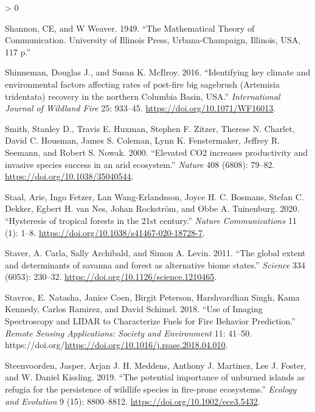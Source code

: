 \documentclass[
  12pt,
]{article}
\newlength{\cslhangindent}
\newenvironment{CSLReferences}[2] %
 {%
  \setlength{\parindent}{0pt}
  \ifodd #1 \everypar{\setlength{\hangindent}{\cslhangindent}}\ignorespaces\fi
  \ifnum #2 > 0
  \setlength{\parskip}{#2\baselineskip}
  \fi
 }%
 {}
\begin{document}
\begin{CSLReferences}{1}{0}
\leavevmode\hypertarget{ref-Shannon1949}{}%
Shannon, CE, and W Weaver. 1949. {``The Mathematical Theory of
Communication. University of Illinois Press, Urbana-Champaign, Illinois,
USA, 117 p.''}

\leavevmode\hypertarget{ref-Shinneman2016}{}%
Shinneman, Douglas J., and Susan K. McIlroy. 2016. {``{Identifying key
climate and environmental factors affecting rates of post-fire big
sagebrush (Artemisia tridentata) recovery in the northern Columbia
Basin, USA}.''} \emph{International Journal of Wildland Fire} 25:
933--45. \url{https://doi.org/10.1071/WF16013}.

\leavevmode\hypertarget{ref-Smith2000}{}%
Smith, Stanley D., Travis E. Huxman, Stephen F. Zitzer, Therese N.
Charlet, David C. Housman, James S. Coleman, Lynn K. Fenstermaker,
Jeffrey R. Seemann, and Robert S. Nowak. 2000. {``{Elevated CO2
increases productivity and invasive species success in an arid
ecosystem}.''} \emph{Nature} 408 (6808): 79--82.
\url{https://doi.org/10.1038/35040544}.

\leavevmode\hypertarget{ref-Staal2020}{}%
Staal, Arie, Ingo Fetzer, Lan Wang-Erlandsson, Joyce H. C. Bosmans,
Stefan C. Dekker, Egbert H. van Nes, Johan Rockström, and Obbe A.
Tuinenburg. 2020. {``{Hysteresis of tropical forests in the 21st
century}.''} \emph{Nature Communications} 11 (1): 1--8.
\url{https://doi.org/10.1038/s41467-020-18728-7}.

\leavevmode\hypertarget{ref-Staver2011}{}%
Staver, A. Carla, Sally Archibald, and Simon A. Levin. 2011. {``{The
global extent and determinants of savanna and forest as alternative
biome states}.''} \emph{Science} 334 (6053): 230--32.
\url{https://doi.org/10.1126/science.1210465}.

\leavevmode\hypertarget{ref-Stavros2018}{}%
Stavros, E. Natasha, Janice Coen, Birgit Peterson, Harshvardhan Singh,
Kama Kennedy, Carlos Ramirez, and David Schimel. 2018. {``Use of Imaging
Spectroscopy and {LIDAR} to Characterize Fuels for Fire Behavior
Prediction.''} \emph{Remote Sensing Applications: Society and
Environment} 11: 41--50.
https://doi.org/\url{https://doi.org/10.1016/j.rsase.2018.04.010}.

\leavevmode\hypertarget{ref-Steenvoorden2019}{}%
Steenvoorden, Jasper, Arjan J. H. Meddens, Anthony J. Martinez, Lee J.
Foster, and W. Daniel Kissling. 2019. {``{The potential importance of
unburned islands as refugia for the persistence of wildlife species in
fire-prone ecosystems}.''} \emph{Ecology and Evolution} 9 (15):
8800--8812. \url{https://doi.org/10.1002/ece3.5432}.


\end{CSLReferences}
\end{document}
